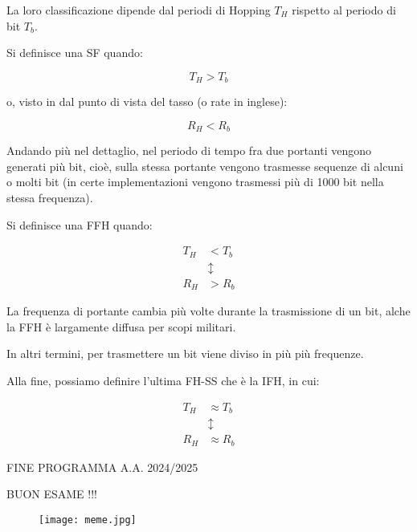 La loro classificazione dipende dal periodi di Hopping $T_H$ 
rispetto al periodo di bit $T_b$. \newline 

Si definisce una SF quando: 

{
    \Large 
    \begin{equation}
        T_H > T_b
    \end{equation}
}

o, visto in dal punto di vista del tasso (o rate in inglese): 

{
    \Large 
    \begin{equation}
        R_H < R_b
    \end{equation}
}

Andando più nel dettaglio, 
nel periodo di tempo fra due portanti vengono generati più bit, 
cioè, sulla stessa portante vengono trasmesse sequenze di alcuni o molti bit 
(in certe implementazioni vengono trasmessi più di 1000 bit nella stessa frequenza). \newline 

Si definisce una FFH quando: 

{
    \Large 
    \begin{equation}
        \begin{split}
            T_H &< T_b
            \\
            &\updownarrow
            \\
            R_H &> R_b
        \end{split}
    \end{equation}
}

La frequenza di portante cambia più volte durante la trasmissione di un bit, 
alche la FFH è largamente diffusa per scopi militari. \newline 

In altri termini, per trasmettere un bit viene diviso in più più frequenze. \newline 

Alla fine, possiamo definire l'ultima FH-SS che è la IFH, 
in cui:

{
    \Large 
    \begin{equation}
        \begin{split}
            T_H &\approx T_b
            \\
            &\updownarrow
            \\
            R_H &\approx R_b
        \end{split}
    \end{equation}
}

\newpage 

FINE PROGRAMMA A.A. 2024/2025 \newline 

BUON ESAME !!!


\begin{figure}[h]
    \centering
    \texttt{[image: meme.jpg]}
\end{figure}
